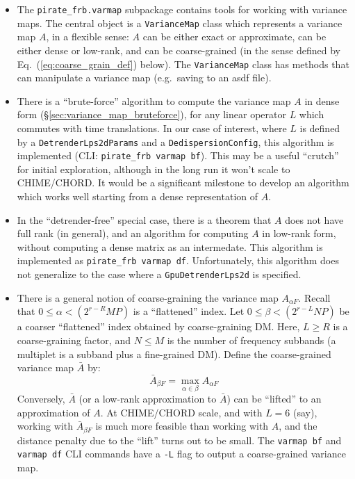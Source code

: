 \documentclass{article}
\numberwithin{equation}{section}   %
\begin{document}
\begin{itemize}

\item The \verb|pirate_frb.varmap| subpackage contains tools for working with variance
 maps. The central object is a \verb|VarianceMap| class which represents a variance map $A$,
 in a flexible sense: $A$ can be either exact or approximate, can be either dense or low-rank,
 and can be coarse-grained (in the sense defined by Eq.\ (\ref{eq:coarse_grain_def}) below).
 The \verb|VarianceMap| class has methods that can manipulate a variance map (e.g.\ saving
 to an asdf file).

\item There is a ``brute-force'' algorithm to compute the variance map $A$ in dense form 
 (\S\ref{sec:variance_map_bruteforce}), for any linear operator $L$ which commutes
 with time translations. In our case of interest, where $L$ is defined by a {\tt DetrenderLps2dParams}
 and a {\tt DedispersionConfig}, this algorithm is implemented (CLI: {\tt pirate\_frb varmap bf}).
 This may be a useful ``crutch'' for initial exploration, although in the long run it won't
 scale to CHIME/CHORD. It would be a significant milestone
 to develop an algorithm which works well starting from a dense representation of $A$.

\item In the ``detrender-free'' special case, there is a theorem that $A$ does not have
 full rank (in general), and an algorithm for computing $A$ in low-rank form, without
 computing a dense matrix as an intermedate.
 This algorithm is implemented as {\tt pirate\_frb varmap df}.
 Unfortunately, this algorithm does not generalize to the case where a {\tt GpuDetrenderLps2d}
 is specified.

\item There is a general notion of coarse-graining the variance map $A_{\alpha F}$.
Recall that $0 \le \alpha < (2^{r-R}MP)$ is a ``flattened'' index. 
Let $0\le \beta < (2^{r-L}NP)$ be a coarser ``flattened''
index obtained by coarse-graining DM. Here, $L \ge R$ is a coarse-graining factor, 
and $N \le M$ is the number of frequency subbands (a multiplet is a subband plus
a fine-grained DM). Define the coarse-grained variance map $\bar A$ by:
\begin{equation}
\bar A_{\beta F} = \max_{\alpha\in\beta} A_{\alpha F}
\label{eq:coarse_grain_def}
\end{equation}
Conversely, $\bar A$ (or a low-rank approximation to $\bar A$) can be ``lifted''
to an approximation of $A$.
At CHIME/CHORD scale, and with $L=6$ (say), working with $\bar A_{\beta F}$ is much
more feasible than working with $A$, and the distance penalty due to the ``lift''
turns out to be small.
The {\tt varmap bf} and {\tt varmap df} CLI commands have a {\tt -L} flag to
output a coarse-grained variance map.


\end{itemize}
\end{document}
